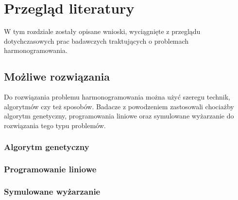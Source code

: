 \chapter{Przegląd literatury}
W tym rozdziale zostały opisane wnioski, wyciągnięte z przeglądu dotychczasowych
prac badawczych traktujących o problemach harmonogramowania.
\section{Możliwe rozwiązania}
Do rozwiązania problemu harmonogramowania można użyć szeregu technik, algorytmów czy też sposobów. Badacze z powodzeniem zastosowali chociażby algorytm genetyczny, programowania liniowe oraz symulowane wyżarzanie\cite{marzec} do rozwiązania tego typu problemów.
\subsection{Algorytm genetyczny}
\subsection{Programowanie liniowe}
\subsection{Symulowane wyżarzanie}